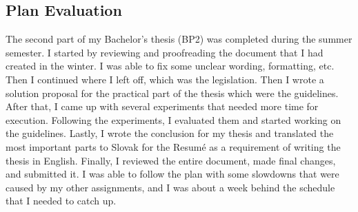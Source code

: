 \subsection*{Plan Evaluation}
The second part of my Bachelor's thesis (BP2) was completed during the summer semester. I started by reviewing and proofreading the document that I had created in the winter. I was able to fix some unclear wording, formatting, etc. Then I continued where I left off, which was the legislation. Then I wrote a solution proposal for the practical part of the thesis which were the guidelines. After that, I came up with several experiments that needed more time for execution. Following the experiments, I evaluated them and started working on the guidelines. Lastly, I wrote the conclusion for my thesis and translated the most important parts to Slovak for the Resumé as a requirement of writing the thesis in English. Finally, I reviewed the entire document, made final changes, and submitted it.
I was able to follow the plan with some slowdowns that were caused by my other assignments, and I was about a week behind the schedule that I needed to catch up.


\begin{refsegment}

\printbibliography[heading=referencessec,segment=\therefsegment,resetnumbers=true]

\end{refsegment}